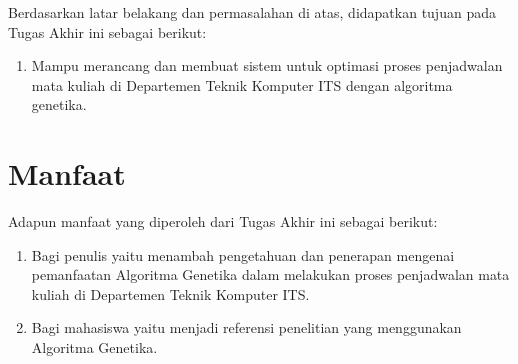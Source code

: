 Berdasarkan latar belakang dan permasalahan di atas, didapatkan tujuan pada Tugas Akhir ini sebagai berikut:
\begin{enumerate}
    \item Mampu merancang dan membuat sistem untuk optimasi proses penjadwalan mata kuliah di Departemen Teknik Komputer ITS dengan algoritma genetika.
\end{enumerate}

\section{Manfaat}
\label{sec:manfaat}

Adapun manfaat yang diperoleh dari Tugas Akhir ini sebagai berikut:
\begin{enumerate}[nolistsep]
    \item Bagi penulis yaitu menambah pengetahuan dan penerapan mengenai pemanfaatan Algoritma Genetika dalam melakukan proses penjadwalan mata kuliah di Departemen Teknik Komputer ITS. 
    \item Bagi mahasiswa yaitu menjadi referensi penelitian yang menggunakan Algoritma Genetika.
\end{enumerate}